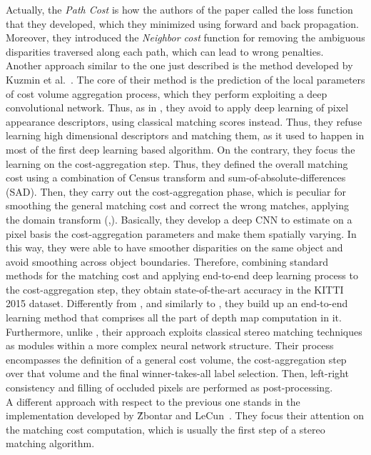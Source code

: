 Actually, the \textit{Path Cost} is how the authors of the paper called the loss function that they developed, which they minimized using forward and back propagation.
Moreover, they introduced the \textit{Neighbor cost} function for removing the ambiguous disparities traversed along each path, which can lead to wrong penalties.\\
Another approach similar to the one just described is the method developed by Kuzmin et al.~\cite{Kuzmin2017}. 
The core of their method is the prediction of the local parameters of cost volume aggregation process, which they perform exploiting a deep convolutional network. 
Thus, as in \cite{Seki2017}, they avoid to apply deep learning of pixel appearance descriptors, using classical matching scores instead. 
Thus, they refuse learning high dimensional descriptors and matching them, as it used to happen in most of the first deep learning based algorithm.
On the contrary, they focus the learning on the cost-aggregation step. 
Thus, they defined the overall matching cost using a combination of Census transform and sum-of-absolute-differences (SAD). 
Then, they carry out the cost-aggregation phase, which is peculiar for smoothing the general matching cost and correct the wrong matches, applying the domain transform (\cite{Gastal2011},\cite{Pham2013}).
Basically, they develop a deep CNN to estimate on a pixel basis the cost-aggregation parameters and make them spatially varying. 
In this way, they were able to have smoother disparities on the same object and avoid smoothing across object boundaries. 
Therefore, combining standard methods for the matching cost and applying end-to-end deep learning process to the cost-aggregation step, they obtain state-of-the-art accuracy in the KITTI 2015 dataset. 
Differently from \cite{Zbontar2016}, \cite{Zbontar2015} and similarly to \cite{Mayer2016}, they build up an end-to-end learning method that comprises all the part of depth map computation in it. 
Furthermore, unlike \cite{Mayer2016}, their approach exploits classical stereo matching techniques as modules within a more complex neural network structure. 
Their process encompasses the definition of a general cost volume, the cost-aggregation step over that volume and the final winner-takes-all label selection. 
Then, left-right consistency and filling of occluded pixels are performed as post-processing.\\
A different approach with respect to the previous one stands in the implementation developed by \^{Z}bontar and LeCun~\cite{Zbontar2016}.
They focus their attention on the matching cost computation, which is usually the first step of a stereo matching algorithm. 
